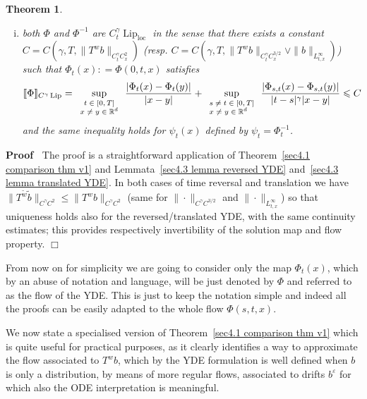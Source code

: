 \documentclass[10pt]{article}
\newcommand{\tmop}[1]{\ensuremath{\operatorname{#1}}}
\newcommand{\tmscript}[1]{\text{\scriptsize{$#1$}}}
\newenvironment{enumerateroman}{\begin{enumerate}[i.] }{\end{enumerate}}
\newenvironment{proof}{\noindent\textbf{Proof\ }}{\hspace*{\fill}$\Box$\medskip}
\newtheorem{theorem}{Theorem}
\begin{document}
\begin{theorem}
\begin{enumerateroman}
    \item both $\Phi$ and $\Phi^{- 1}$ are $C^{\gamma}_t
    \tmop{Lip}_{\tmop{loc}}$ in the sense that there exists a constant $C = C
    (\gamma, T, \| T^w b \|_{C^{\gamma}_t C^2_x})$ (resp. $C = C (\gamma, T,
    \| T^w b \|_{C^{\gamma}_t C^{3 / 2}_x} \vee \| b \|_{L^{\infty}_{t, x}})$)
    such that $\Phi_t (x) : = \Phi (0, t, x)$ satisfies
    \[ \llbracket \Phi \rrbracket_{C^{\gamma} \tmop{Lip}} =
       \sup_{\tmscript{\begin{array}{c}
         t \in [0, T]\\
         x \neq y \in \mathbb{R}^d
       \end{array}}} \frac{| \Phi_t (x) - \Phi_t (y) |}{| x - y |} +
       \sup_{\tmscript{\begin{array}{l}
         s \neq t \in [0, T]\\
         x \neq y \in \mathbb{R}^d
       \end{array}}} \frac{| \Phi_{s, t} (x) - \Phi_{s, t} (y) |}{| t - s
       |^{\gamma} | x - y |} \leqslant C \]
    and the same inequality holds for $\psi_t (x)$ defined by $\psi_t =
    \Phi_t^{- 1}$.
  \end{enumerateroman}
\end{theorem}

\begin{proof}
  The proof is a straightforward application of Theorem~\ref{sec4.1 comparison
  thm v1} and Lemmata~\ref{sec4.3 lemma reversed YDE} and~\ref{sec4.3 lemma
  translated YDE}. In both cases of time reversal and translation we have $\|
  T^{\tilde{w}} \tilde{b} \|_{C^{\gamma} C^2} \leqslant \| T^w b
  \|_{C^{\gamma} C^2}$ (same for $\| \cdot \|_{C^{\gamma} C^{3 / 2}}$ and $\|
  \cdot \|_{L^{\infty}_{t, x}}$) so that uniqueness holds also for the
  reversed/translated YDE, with the same continuity estimates; this provides
  respectively invertibility of the solution map and flow property.
\end{proof}

From now on for simplicity we are going to consider only the map $\Phi_t (x)$,
which by an abuse of notation and language, will be just denoted by $\Phi$ and
referred to as the flow of the YDE. This is just to keep the notation simple
and indeed all the proofs can be easily adapted to the whole flow $\Phi (s, t,
x)$.

We now state a specialised version of Theorem~\ref{sec4.1 comparison thm v1}
which is quite useful for practical purposes, as it clearly identifies a way
to approximate the flow associated to $T^w b$, which by the YDE formulation is
well defined when $b$ is only a distribution, by means of more regular flows,
associated to drifts $b^{\varepsilon}$ for which also the ODE interpretation
is meaningful.
\end{document}

